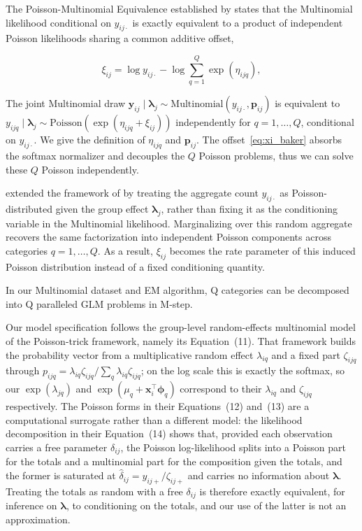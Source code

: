 The Poisson-Multinomial Equivalence established by \citet{Baker1994} states that the Multinomial likelihood conditional on $y_{ij\cdot}$ is exactly equivalent to a product of independent Poisson likelihoods sharing a common additive offset,

\begin{equation}
    \xi_{ij} = \log y_{ij\cdot} - \log\sum_{q=1}^Q \exp(\eta_{ijq}),
    \label{eq:xi_baker}
\end{equation}

The joint Multinomial draw $\bm{y}_{ij} \mid \bm{\lambda}_{j} \sim \mathrm{Multinomial}(y_{ij\cdot}, \bm{p}_{ij})$ is equivalent to $y_{ijq} \mid \bm{\lambda}_{j} \sim \mathrm{Poisson}(\exp(\eta_{ijq} + \xi_{ij}))$ independently for $q = 1, \ldots, Q$, conditional on $y_{ij\cdot}$. We give the definition of $\eta_{ijq}$ and $\bm{p}_{ij}$. The offset~\eqref{eq:xi_baker} absorbs the softmax normalizer and decouples the $Q$ Poisson problems, thus we can solve these $Q$ Poisson independently. 

\citet{Lee2017} extended the framework of \citet{Baker1994} by treating the aggregate count $y_{ij\cdot}$ as Poisson-distributed given the group effect $\bm{\lambda}_{j}$, rather than fixing it as the conditioning variable in the Multinomial likelihood. Marginalizing over this random aggregate recovers the same factorization into independent Poisson components across categories $q = 1, \dots, Q$. As a result, $\xi_{ij}$ becomes the rate parameter of this induced Poisson distribution instead of a fixed conditioning quantity.

In our Multinomial dataset and EM algorithm, Q categories can be decomposed into Q paralleled GLM problems in M-step.

Our model specification follows the group-level random-effects multinomial model of the Poisson-trick framework, namely its Equation~(11). That framework builds the probability vector from a multiplicative random effect $\lambda_{iq}$ and a fixed part $\zeta_{ijq}$ through $p_{ijq}=\lambda_{iq}\zeta_{ijq}/\sum_{q}\lambda_{iq}\zeta_{ijq}$; on the log scale this is exactly the softmax, so our $\exp(\lambda_{jq})$ and $\exp(\mu_q+\mathbf{x}_i^{\top}\bm{\phi}_q)$ correspond to their $\lambda_{iq}$ and $\zeta_{ijq}$ respectively. The Poisson forms in their Equations~(12) and~(13) are a computational surrogate rather than a different model: the likelihood decomposition in their Equation~(14) shows that, provided each observation carries a free parameter $\delta_{ij}$, the Poisson log-likelihood splits into a Poisson part for the totals and a multinomial part for the composition given the totals, and the former is saturated at $\hat\delta_{ij}=y_{ij+}/\zeta_{ij+}$ and carries no information about $\bm{\lambda}$. Treating the totals as random with a free $\delta_{ij}$ is therefore exactly equivalent, for inference on $\bm{\lambda}$, to conditioning on the totals, and our use of the latter is not an approximation.

